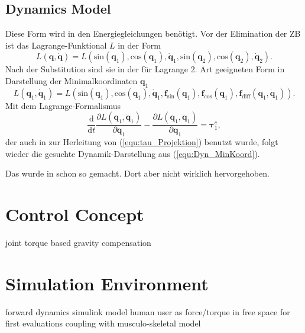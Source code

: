 \documentclass[letterpaper, 10 pt, conference]{ieeeconf}  %
\begin{document}
\subsection{Dynamics Model}

\label{sec:Lagrange2Elim}
%
Diese Form wird in den Energiegleichungen benötigt.
Vor der Elimination der ZB ist das Lagrange-Funktional $L$ in der Form
\begin{equation}
L(\bm{q},\dot{\bm{q}})=L(\mathrm{sin}(\bm{q}_1),\mathrm{cos}(\bm{q}_1),\dot{\bm{q}}_1,\mathrm{sin}(\bm{q}_2),\mathrm{cos}(\bm{q}_2),\dot{\bm{q}}_2).
\end{equation}
Nach der Substitution sind sie in der für Lagrange 2. Art geeigneten Form in Darstellung der Minimalkoordinaten $\bm{q}_1$
%
\begin{equation}
L(\bm{q}_1,\dot{\bm{q}}_1)=L(\mathrm{sin}(\bm{q}_1),\mathrm{cos}(\bm{q}_1),\dot{\bm{q}}_1,\bm{f}_\mathrm{sin}(\bm{q}_1),\bm{f}_\mathrm{cos}(\bm{q}_1), \bm{f}_\mathrm{diff}(\bm{q}_1,\dot{\bm{q}}_1)).
\end{equation}
%
Mit dem Lagrange-Formalismus
%
\begin{equation}
\frac{\mathrm{d}}{\mathrm{d}t}\frac{\partial L(\bm{q}_1,\dot{\bm{q}}_1)}{\partial \dot{\bm{q}}_1} - \frac{\partial L(\bm{q}_1,\dot{\bm{q}}_1)}{\partial \bm{q}_1} = \bm{\tau}^c_1,
\end{equation}
%
der auch in \cite{NakamuraGho1989} zur Herleitung von (\ref{equ:tau_Projektion}) benutzt wurde, folgt wieder die gesuchte Dynamik-Darstellung aus (\ref{equ:Dyn_MinKoord}).

%
Das wurde in \cite{WangGosselin1998} schon so gemacht. Dort aber nicht wirklich hervorgehoben.

\section{Control Concept}

joint torque based gravity compensation

\section{Simulation Environment}

forward dynamics
simulink model
human user as force/torque in free space for first evaluations
coupling with musculo-skeletal model \cite{KuehnHuSchHad2018}
\end{document}
